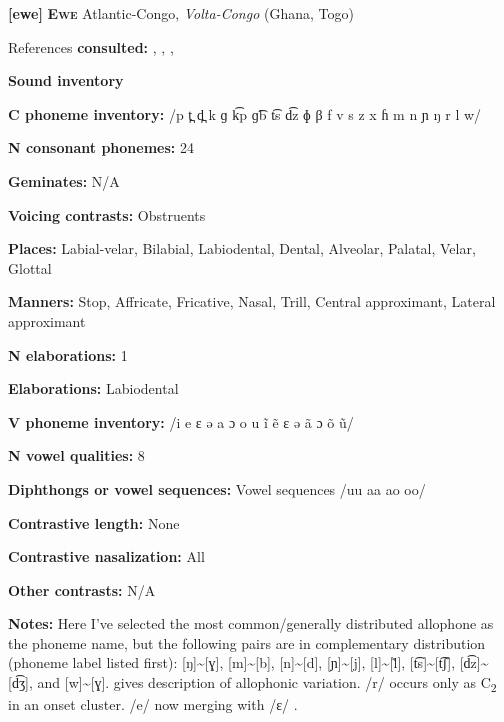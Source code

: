 \textbf{[ewe]}   \textbf{\textsc{Ewe}}  Atlantic-Congo, \textit{Volta-Congo} (Ghana, Togo)



References \textbf{consulted:} \citet{Ameka1991}, \citet{Duthie1996}, \citet{Jalloh2005}, \citet{Stahlke1971}



\textbf{Sound inventory}



\textbf{C phoneme inventory:} /p t̪ d̪ k ɡ k͡p ɡ͡b t͡s d͡z ɸ β f v s z x ɦ m n ɲ ŋ r l w/



\textbf{N consonant phonemes:} 24



\textbf{Geminates:} N/A



\textbf{Voicing contrasts:} Obstruents



\textbf{Places:} Labial-velar, Bilabial, Labiodental, Dental, Alveolar, Palatal, Velar, Glottal



\textbf{Manners:} Stop, Affricate, Fricative, Nasal, Trill, Central approximant, Lateral approximant



\textbf{N elaborations:} 1



\textbf{Elaborations:} Labiodental



\textbf{V phoneme inventory:} /i e ɛ ə a ɔ o u ĩ ẽ ɛ ə ã ɔ õ ũ/



\textbf{N vowel qualities:} 8



\textbf{Diphthongs or vowel sequences:} Vowel sequences /uu aa ao oo/



\textbf{Contrastive length:} None



\textbf{Contrastive nasalization:} All



\textbf{Other contrasts:} N/A



\textbf{Notes:} Here I’ve selected the most common/generally distributed allophone as the phoneme name, but the following pairs are in complementary distribution (phoneme label listed first): [ŋ]{\textasciitilde}[ɣ], [m]{\textasciitilde}[b], [n]{\textasciitilde}[d], [ɲ]{\textasciitilde}[j], [l]{\textasciitilde}[\~{l}], [t͡s]{\textasciitilde}[t͡ʃ], [d͡z]{\textasciitilde}[d͡ʒ], and [w]{\textasciitilde}[ɣ]. \citet[10-18]{Duthie1996} gives description of allophonic variation. /r/ occurs only as C\textsubscript{2} in an onset cluster. /e/ now merging with /ɛ/ \citep[19]{Duthie1996}.



